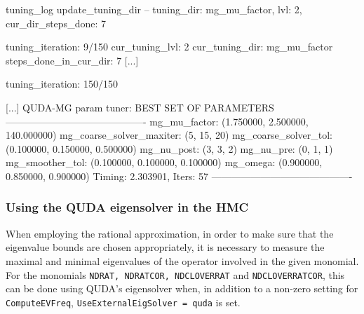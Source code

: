 \begin{SaveVerbatim}{tuning_log}
update_tuning_dir -- tuning_dir: mg_mu_factor, lvl: 2, cur_dir_steps_done: 7

tuning_iteration: 9/150
cur_tuning_lvl: 2
cur_tuning_dir: mg_mu_factor
steps_done_in_cur_dir: 7
[...]

tuning_iteration: 150/150

[...]
QUDA-MG param tuner: BEST SET OF PARAMETERS
-------------------------------------------
             mg_mu_factor: (1.750000, 2.500000, 140.000000)
 mg_coarse_solver_maxiter: (5, 15, 20)
     mg_coarse_solver_tol: (0.100000, 0.150000, 0.500000)
               mg_nu_post: (3, 3, 2)
                mg_nu_pre: (0, 1, 1)
          mg_smoother_tol: (0.100000, 0.100000, 0.100000)
                 mg_omega: (0.900000, 0.850000, 0.900000)
Timing: 2.303901, Iters: 57
-------------------------------------------
\end{SaveVerbatim}

\subsubsection{Using the QUDA eigensolver in the HMC}

When employing the rational approximation, in order to make sure that the eigenvalue bounds are chosen appropriately, it is necessary to measure the maximal and minimal eigenvalues of the operator involved in the given monomial.
For the monomials \texttt{NDRAT, NDRATCOR, NDCLOVERRAT} and \texttt{NDCLOVERRATCOR}, this can be done using QUDA's eigensolver when, in addition to a non-zero setting for \texttt{ComputeEVFreq}, \texttt{UseExternalEigSolver = quda} is set.

